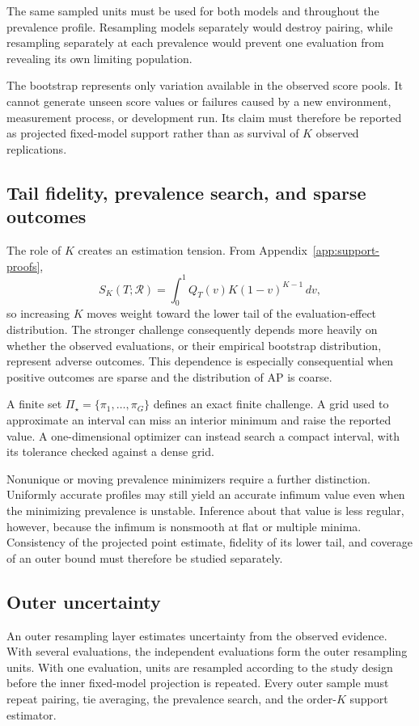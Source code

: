 \documentclass[11pt]{article}
\newcommand{\Regime}{\mathcal{R}}
\newcommand{\PSet}{\Pi_\star}
\theoremstyle{remark}
\begin{document}
The same sampled units must be used for both models and throughout the prevalence profile. Resampling models separately would destroy pairing, while resampling separately at each prevalence would prevent one evaluation from revealing its own limiting population.

The bootstrap represents only variation available in the observed score pools. It cannot generate unseen score values or failures caused by a new environment, measurement process, or development run. Its claim must therefore be reported as projected fixed-model support rather than as survival of $K$ observed replications.

\subsection{Tail fidelity, prevalence search, and sparse outcomes}

The role of $K$ creates an estimation tension. From Appendix~\ref{app:support-proofs},
\[
S_K(T;\Regime)
=
\int_0^1Q_T(v)K(1-v)^{K-1}\,dv,
\]
so increasing $K$ moves weight toward the lower tail of the evaluation-effect distribution. The stronger challenge consequently depends more heavily on whether the observed evaluations, or their empirical bootstrap distribution, represent adverse outcomes. This dependence is especially consequential when positive outcomes are sparse and the distribution of AP is coarse.

A finite set $\PSet=\{\pi_1,\ldots,\pi_G\}$ defines an exact finite challenge. A grid used to approximate an interval can miss an interior minimum and raise the reported value. A one-dimensional optimizer can instead search a compact interval, with its tolerance checked against a dense grid.

Nonunique or moving prevalence minimizers require a further distinction. Uniformly accurate profiles may still yield an accurate infimum value even when the minimizing prevalence is unstable. Inference about that value is less regular, however, because the infimum is nonsmooth at flat or multiple minima. Consistency of the projected point estimate, fidelity of its lower tail, and coverage of an outer bound must therefore be studied separately.

\subsection{Outer uncertainty}

An outer resampling layer estimates uncertainty from the observed evidence. With several evaluations, the independent evaluations form the outer resampling units. With one evaluation, units are resampled according to the study design before the inner fixed-model projection is repeated. Every outer sample must repeat pairing, tie averaging, the prevalence search, and the order-$K$ support estimator.
\end{document}
